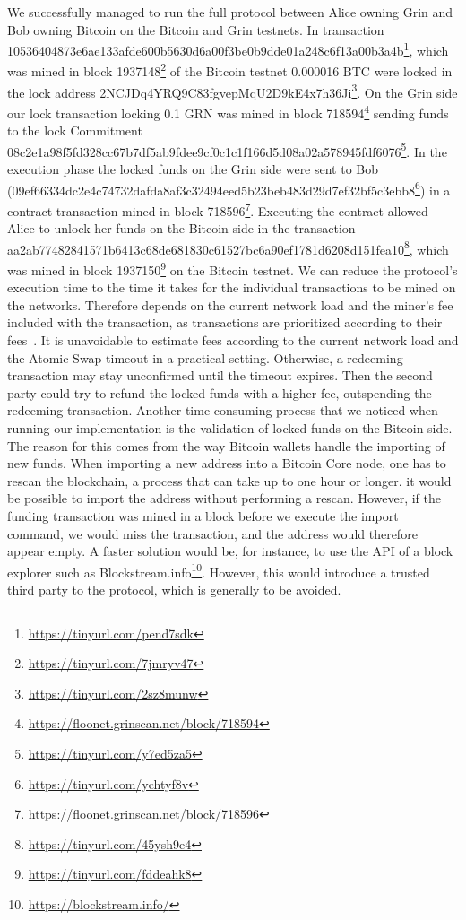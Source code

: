 We successfully managed to run the full protocol between Alice owning Grin and Bob owning Bitcoin on the Bitcoin and Grin testnets.
In transaction \\10536404873e6ae133afde600b5630d6a00f3be0b9dde01a248c6f13a00b3a4b\footnote{\url{https://tinyurl.com/pend7sdk}}, which was mined in block 1937148\footnote{\url{https://tinyurl.com/7jmryv47}} of the Bitcoin testnet 0.000016 BTC were locked in the lock address 2NCJDq4YRQ9C83fgvepMqU2D9kE4x7h36Ji\footnote{\url{https://tinyurl.com/2sz8munw}}.
On the Grin side our lock transaction locking 0.1 GRN was mined in block 718594\footnote{\url{https://floonet.grinscan.net/block/718594}} sending funds to the lock Commitment \\08c2e1a98f5fd328cc67b7df5ab9fdee9cf0c1c1f166d5d08a02a578945fdf6076\footnote{\url{https://tinyurl.com/y7ed5za5}}.
In the execution phase the locked funds on the Grin side were sent to Bob \\(09ef66334dc2e4c74732dafda8af3c32494eed5b23beb483d29d7ef32bf5c3ebb8\footnote{\url{https://tinyurl.com/ychtyf8v}}) in a contract transaction mined in block 718596\footnote{\url{https://floonet.grinscan.net/block/718596}}.
Executing the contract allowed Alice to unlock her funds on the Bitcoin side in the transaction \\ aa2ab77482841571b6413c68de681830c61527bc6a90ef1781d6208d151fea10\footnote{\url{https://tinyurl.com/45ysh9e4}}, which was mined in block 1937150\footnote{\url{https://tinyurl.com/fddeahk8}} on the Bitcoin testnet.
We can reduce the protocol's execution time to the time it takes for the individual transactions to be mined on the networks.
Therefore depends on the current network load and the miner's fee included with the transaction, as transactions are prioritized according to their fees~\cite{kasahara2016effect}.
It is unavoidable to estimate fees according to the current network load and the Atomic Swap timeout in a practical setting.
Otherwise, a redeeming transaction may stay unconfirmed until the timeout expires.
Then the second party could try to refund the locked funds with a higher fee, outspending the redeeming transaction.
Another time-consuming process that we noticed when running our implementation is the validation of locked funds on the Bitcoin side.
The reason for this comes from the way Bitcoin wallets handle the importing of new funds.
When importing a new address into a Bitcoin Core node, one has to rescan the blockchain, a process that can take up to one hour or longer.
it would be possible to import the address without performing a rescan.
However, if the funding transaction was mined in a block before we execute the import command, we would miss the transaction, and the address would therefore appear empty.
A faster solution would be, for instance, to use the API of a block explorer such as Blockstream.info\footnote{\url{https://blockstream.info/}}.
However, this would introduce a trusted third party to the protocol, which is generally to be avoided.